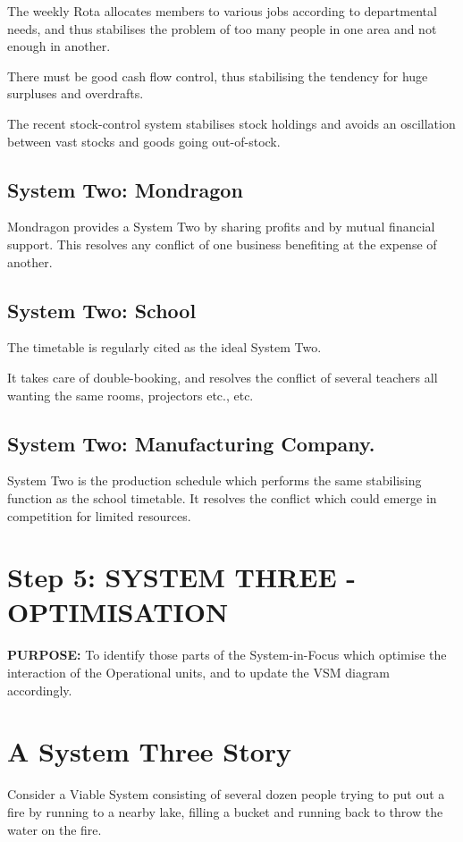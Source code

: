 The weekly Rota allocates members to various jobs according to departmental needs, and thus stabilises the problem of too many people in one area and not enough in another.

There must be good cash flow control, thus stabilising the tendency for huge surpluses and overdrafts.

The recent stock-control system stabilises stock holdings and avoids an oscillation between vast stocks and goods going out-of-stock.

\subsection*{System Two: Mondragon}
Mondragon provides a System Two by sharing profits and by mutual financial support. This resolves any conflict of one business benefiting at the expense of another.

\subsection*{System Two: School}
The timetable is regularly cited as the ideal System Two.

It takes care of double-booking, and resolves the conflict of several teachers all wanting the same rooms, projectors etc., etc.

\subsection*{System Two: Manufacturing Company.}
System Two is the production schedule which performs the same stabilising function as the school timetable. It resolves the conflict which could emerge in competition for limited resources.

\section*{Step 5: SYSTEM THREE - OPTIMISATION}
\textbf{PURPOSE:} To identify those parts of the System-in-Focus which optimise the interaction of the Operational units, and to update the VSM diagram accordingly.

\section*{A System Three Story}
Consider a Viable System consisting of several dozen people trying to put out a fire by running to a nearby lake, filling a bucket and running back to throw the water on the fire.

